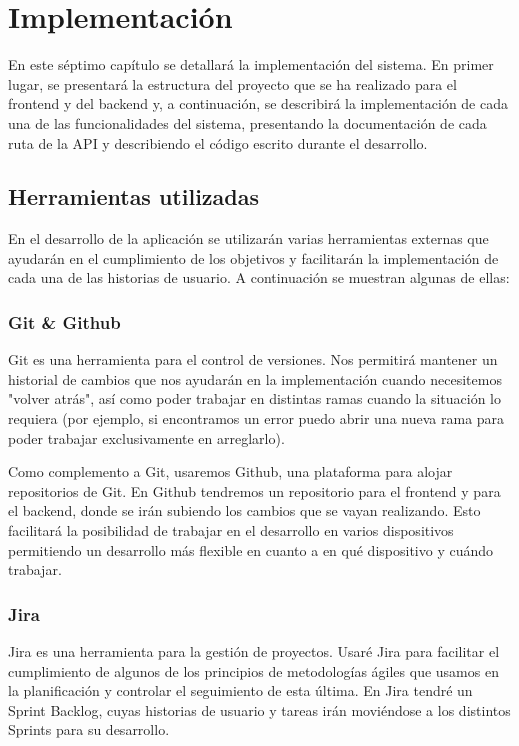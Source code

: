 \chapter{Implementación}
En este séptimo capítulo se detallará la implementación del sistema. En primer lugar,  se presentará la estructura del proyecto que se ha realizado para el frontend y del backend y, a continuación,
se describirá la implementación de cada una de las funcionalidades del sistema, presentando la documentación de cada ruta de la API y describiendo el código escrito durante el desarrollo.

\section{Herramientas utilizadas}
En el desarrollo de la aplicación se utilizarán varias herramientas externas que ayudarán en el cumplimiento de los objetivos y facilitarán la implementación de cada una de las historias de usuario. A continuación se muestran algunas
de ellas:

\subsection{Git \& Github}
Git es una herramienta para el control de versiones. Nos permitirá mantener un historial de cambios que nos ayudarán en la implementación cuando necesitemos "volver atrás", así como poder trabajar en distintas ramas cuando la situación lo requiera (por ejemplo, si encontramos un error puedo abrir una nueva rama para poder trabajar exclusivamente en arreglarlo).

Como complemento a Git, usaremos Github, una plataforma para alojar repositorios de Git. En Github tendremos un repositorio para el frontend y para el backend, donde se irán subiendo los cambios que se vayan realizando. Esto facilitará la posibilidad de trabajar en el desarrollo en varios dispositivos permitiendo un desarrollo más flexible en cuanto a en qué dispositivo y cuándo trabajar. 

\subsection{Jira}
Jira es una herramienta para la gestión de proyectos. Usaré Jira para facilitar el cumplimiento de algunos de los principios de metodologías ágiles que usamos en la planificación y controlar el seguimiento de esta última. En Jira tendré un Sprint Backlog, cuyas historias de usuario y tareas irán moviéndose a los distintos Sprints para su desarrollo.

